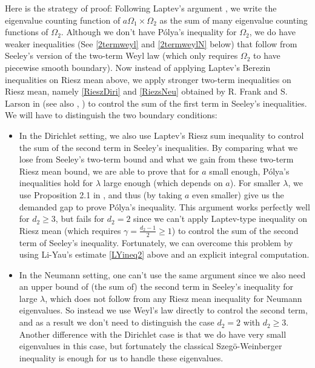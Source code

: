 \documentclass[11pt,letterpaper]{amsart}
\numberwithin{equation}{section}
\theoremstyle{plain}
\theoremstyle{plain}
\numberwithin{equation}{section}
\theoremstyle{remark}
\begin{document}
	Here is the strategy of proof: Following Laptev's argument \cite{AL}, we write the eigenvalue counting function of $a\Omega_1 \times \Omega_2$ as the sum of many  eigenvalue counting functions of $\Omega_2$. Although we don't have P\'olya's inequality for $\Omega_2$, we do have weaker inequalities  (See \eqref{2termweyl} and \eqref{2termweylN} below) that follow from Seeley's version of the two-term Weyl law (which only requires $\Omega_2$ to have piecewise smooth boundary). Now instead of applying Laptev's Berezin inequalities on Riesz mean above, we apply  stronger two-term inequalities on Riesz mean, namely  \eqref{RieszDiri} and \eqref{RiezsNeu} obtained by R. Frank and S. Larson in \cite{FL24Lip} (see also \cite{FG12}, \cite{FL20}) to control the sum of the first term in Seeley's inequalities. We will have to distinguish the two boundary conditions:
	\begin{itemize}
		\item In the Dirichlet setting, we also use Laptev's Riesz sum inequality to control the sum of the second term in Seeley's inequalities. By comparing what we lose from Seeley's two-term bound and what we gain from these two-term Riesz mean bound, we are able to prove that for $a$ small enough, P\'olya's inequalities hold for $\lambda$ large enough (which depends on $a$). For smaller $\lambda$, we use Proposition 2.1 in \cite{FL24convex}, and thus (by taking $a$ even smaller) give us the demanded gap to prove P\'olya's inequality. This argument works perfectly well for $d_2 \ge 3$, but fails for $d_2=2$ since we can't apply Laptev-type inequality on Riesz mean (which requires $\gamma=\frac {d_2-1}2 \ge 1$) to control the sum of the second term of Seeley's inequality. Fortunately, we can overcome this problem by using Li-Yau's estimate \eqref{LYineq2} above and an explicit integral computation.
		\item  In the Neumann setting, one can't use the same argument since we also need an upper bound of (the sum of) the second term in Seeley's inequality for large $\lambda$, which does not follow from any Riesz mean inequality for Neumann eigenvalues. So instead we use Weyl's law directly to control the second term, and as a result we don't need to distinguish the case $d_2 = 2$ with $d_2 \ge 3$. Another difference with the Dirichlet case is that we do have very small eigenvalues in this case, but fortunately the classical Szeg\"o-Weinberger inequality is enough for us to handle these eigenvalues. 
	\end{itemize} 
	
\end{document}
